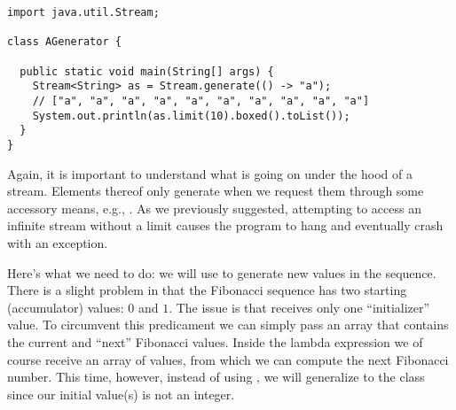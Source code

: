 \begin{cl}[]{}
\begin{lstlisting}[language=MyJava]
import java.util.Stream;

class AGenerator {

  public static void main(String[] args) {
    Stream<String> as = Stream.generate(() -> "a");
    // ["a", "a", "a", "a", "a", "a", "a", "a", "a", "a"]
    System.out.println(as.limit(10).boxed().toList()); 
  } 
}
\end{lstlisting}
\end{cl}

Again, it is important to understand what is going on under the hood of a stream. Elements thereof only generate when we request them through some accessory means, e.g., . As we previously suggested, attempting to access an infinite stream without a limit causes the program to hang and eventually crash with an  exception.


Here's what we need to do: we will use  to generate new values in the sequence. There is a slight problem in that the Fibonacci sequence has two starting (accumulator) values: $0$ and $1$. The issue is that  receives only one ``initializer'' value. To circumvent this predicament we can simply pass an array that contains the current and ``next'' Fibonacci values. Inside the lambda expression we of course receive an array of values, from which we can compute the next Fibonacci number. This time, however, instead of using , we will generalize to the  class since our initial value(s) is not an integer.

